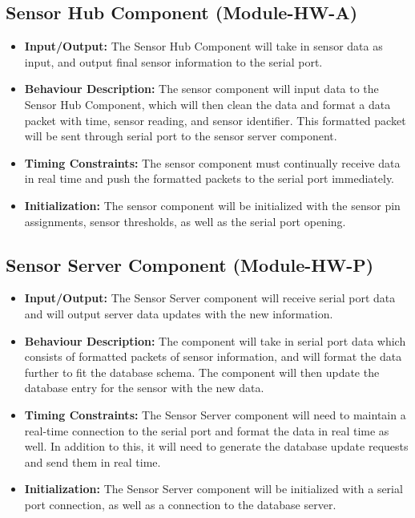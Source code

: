 \documentclass[]{article}
\begin{document}
	\subsection{Sensor Hub Component (Module-HW-A)}
	\begin{itemize}
		\item \textbf{Input/Output:} The Sensor Hub Component will take in sensor data as input, and output final sensor information to the serial port.
		\item \textbf{Behaviour Description:} The sensor component will input data to the Sensor Hub Component, which will then clean the data and format a data packet with time, sensor reading, and sensor identifier. This formatted packet will be sent through serial port to the sensor server component.
		\item \textbf{Timing Constraints:} The sensor component must continually receive data in real time and push the formatted packets to the serial port immediately.
		\item \textbf{Initialization:} The sensor component will be initialized with the sensor pin assignments, sensor thresholds, as well as the serial port opening.
	\end{itemize}
	
	\subsection{Sensor Server Component (Module-HW-P)}
	\begin{itemize}
		\item \textbf{Input/Output:} The Sensor Server component will receive serial port data and will output server data updates with the new information.
		\item \textbf{Behaviour Description:} The component will take in serial port data which consists of formatted packets of sensor information, and will format the data further to fit the database schema. The component will then update the database entry for the sensor with the new data.    
		\item \textbf{Timing Constraints:} The Sensor Server component will need to maintain a real-time connection to the serial port and format the data in real time as well. In addition to this, it will need to generate the database update requests and send them in real time.
		\item \textbf{Initialization:} The Sensor Server component will be initialized with a serial port connection, as well as a connection to the database server.
	\end{itemize}
	
\end{document}
